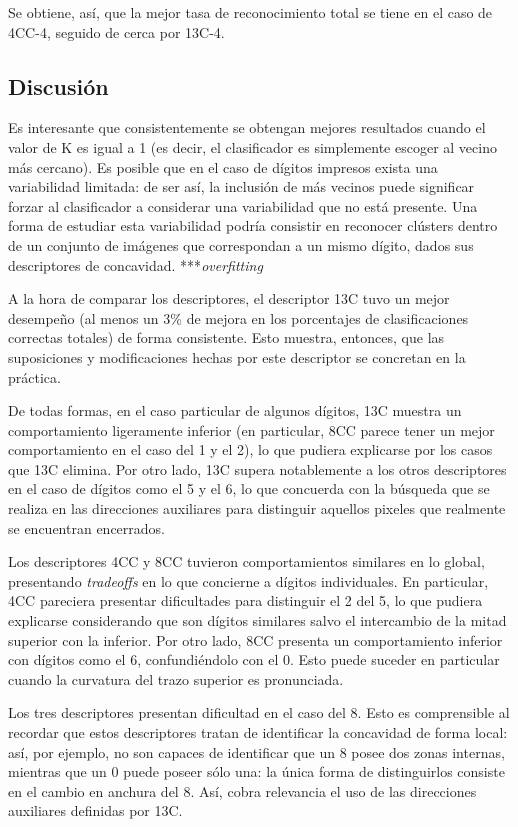 \documentclass[12pt]{article}
\begin{document}
Se obtiene, así, que la mejor tasa de reconocimiento total se tiene en el caso
de 4CC-4, seguido de cerca por 13C-4.

\subsection{Discusión}

Es interesante que consistentemente se obtengan mejores resultados cuando el
valor de K es igual a 1 (es decir, el clasificador es simplemente escoger al
vecino más cercano). Es posible que en el caso de dígitos impresos exista una
variabilidad limitada: de ser así, la inclusión de más vecinos puede significar
forzar al clasificador a considerar una variabilidad que no está presente. Una
forma de estudiar esta variabilidad podría consistir en reconocer clústers
dentro de un conjunto de imágenes que correspondan a un mismo dígito, dados sus
descriptores de concavidad. ***\emph{overfitting}

A la hora de comparar los descriptores, el descriptor 13C tuvo un mejor
desempeño (al menos un 3\% de mejora en los porcentajes de clasificaciones
correctas totales) de forma consistente. Esto muestra, entonces, que las
suposiciones y modificaciones hechas por este descriptor se concretan en la
práctica. 

De todas formas, en el caso particular de algunos dígitos, 13C muestra un
comportamiento ligeramente inferior (en particular, 8CC parece tener un mejor
comportamiento en el caso del 1 y el 2), lo que pudiera explicarse por los casos
que 13C elimina. Por otro lado, 13C supera notablemente a los otros descriptores
en el caso de dígitos como el 5 y el 6, lo que concuerda con la búsqueda que se
realiza en las direcciones auxiliares para distinguir aquellos pixeles que
realmente se encuentran encerrados.

Los descriptores 4CC y 8CC tuvieron comportamientos similares en lo global,
presentando \emph{tradeoffs} en lo que concierne a dígitos individuales. En
particular, 4CC pareciera presentar dificultades para distinguir el 2 del 5, lo
que pudiera explicarse considerando que son dígitos similares salvo el
intercambio de la mitad superior con la inferior. Por otro lado, 8CC presenta un
comportamiento inferior con dígitos como el 6, confundiéndolo con el 0. Esto
puede suceder en particular cuando la curvatura del trazo superior es
pronunciada.

Los tres descriptores presentan dificultad en el caso del 8. Esto es
comprensible al recordar que estos descriptores tratan de identificar la
concavidad de forma local: así, por ejemplo, no son capaces de identificar que
un 8 posee dos zonas internas, mientras que un 0 puede poseer sólo una: la única
forma de distinguirlos consiste en el cambio en anchura del 8. Así, cobra
relevancia el uso de las direcciones auxiliares definidas por 13C.
\end{document}
